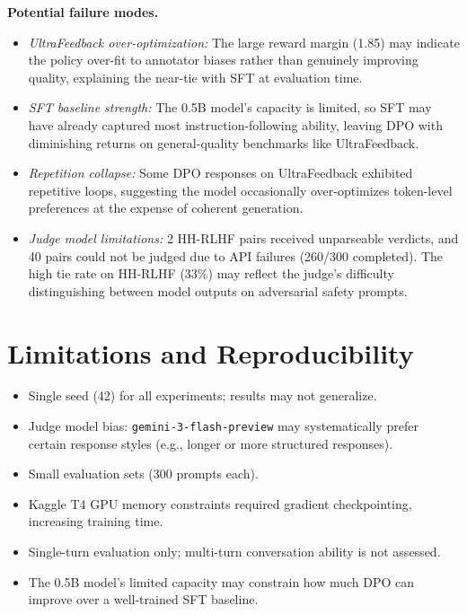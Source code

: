 \documentclass[11pt,a4paper]{article}
\begin{document}
\textbf{Potential failure modes.}
\begin{itemize}
    \item \textit{UltraFeedback over-optimization:} The large reward margin (1.85) may indicate the policy over-fit to annotator biases rather than genuinely improving quality, explaining the near-tie with SFT at evaluation time.
    \item \textit{SFT baseline strength:} The 0.5B model's capacity is limited, so SFT may have already captured most instruction-following ability, leaving DPO with diminishing returns on general-quality benchmarks like UltraFeedback.
    \item \textit{Repetition collapse:} Some DPO responses on UltraFeedback exhibited repetitive loops, suggesting the model occasionally over-optimizes token-level preferences at the expense of coherent generation.
    \item \textit{Judge model limitations:} 2 HH-RLHF pairs received unparseable verdicts, and 40 pairs could not be judged due to API failures (260/300 completed). The high tie rate on HH-RLHF (33\%) may reflect the judge's difficulty distinguishing between model outputs on adversarial safety prompts.
\end{itemize}

\section{Limitations and Reproducibility}
\label{sec:limitations}

\begin{itemize}
    \item Single seed (42) for all experiments; results may not generalize.
    \item Judge model bias: \texttt{gemini-3-flash-preview} may systematically prefer certain response styles (e.g., longer or more structured responses).
    \item Small evaluation sets (300 prompts each).
    \item Kaggle T4 GPU memory constraints required gradient checkpointing, increasing training time.
    \item Single-turn evaluation only; multi-turn conversation ability is not assessed.
    \item The 0.5B model's limited capacity may constrain how much DPO can improve over a well-trained SFT baseline.
\end{itemize}
\end{document}
